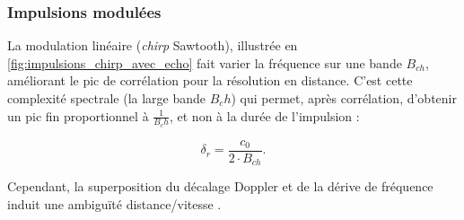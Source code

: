 \subsubsection{Impulsions modulées}
La modulation linéaire (\emph{chirp} Sawtooth), illustrée en \ref{fig:impulsions_chirp_avec_echo} fait varier la fréquence sur une bande $B_{ch}$, améliorant le pic de corrélation pour la résolution en distance. C'est cette complexité spectrale (la large bande $B_ch$) qui permet, après corrélation, d'obtenir un pic fin proportionnel à $\frac{1}{B_ch}$, et non à la durée de l'impulsion :

\begin{equation}
    \delta_r = \frac{c_0}{2\cdot B_{ch}}.
    \label{eq:resolution_en_distance_chirp}
\end{equation}

Cependant, la superposition du décalage Doppler et de la dérive de fréquence induit une ambiguïté distance/vitesse \cite{cumming2005}.

